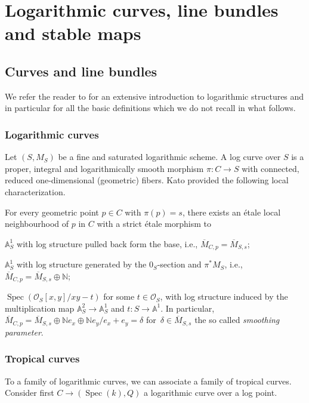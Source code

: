 \section{Logarithmic curves, line bundles and stable maps}
\subsection{Curves and line bundles}
We
refer the reader to \cite{ogus} for an extensive introduction to logarithmic structures and in particular for all the basic definitions which we do not recall in what follows.
\subsubsection{Logarithmic curves}
Let $(S,M_S)$ be a fine and saturated logarithmic scheme. A log curve over $S$ is a proper, integral and logarithmically smooth morphism $\pi\colon C\to S$ with connected, reduced one-dimensional (geometric) fibers.
Kato provided the following local characterization.
\begin{theo}
For every geometric point $p\in C$ with $\pi(p)=s$, there exists an \'etale local neighbourhood of $p$ in $C$ with a strict \'etale morphism to
\begin{description}\itemsep=0pt
 \item[\emph{smooth point:}] $\mathbb A^1_S$ with log structure pulled back form the base, i.e., $\overline{M}_{C,p}=\overline M_{S,s}$;
 \item[\emph{marking:}] $\mathbb A^1_S$ with log structure generated by the $0_S$-section and $\pi^*M_S$, i.e., $\overline{M}_{C,p}=\overline M_{S,s}\oplus \mathbb N$;
 \item[\emph{node:}] $\operatorname{Spec}(\mathcal O_S[x,y]/xy-t)$ for some $t\in\mathcal O_S$, with log structure induced by the multiplication map $\mathbb A^2_S\to\mathbb A^1_S$ and $t\colon S\to \mathbb A^1$. In particular, $\overline{M}_{C,p}=\overline M_{S,s}\oplus \mathbb N e_x\oplus \mathbb N e_y\slash e_x+e_y=\delta$ for~${\delta\in \overline{M}_{S,s}}$ the so called \emph{smoothing parameter}.
\end{description}
\end{theo}

\subsubsection{Tropical curves}

To a family of logarithmic curves, we can associate a family of tropical curves.
Consider first $C\to (\operatorname{Spec}(k),Q)$ a logarithmic curve over a log point.

